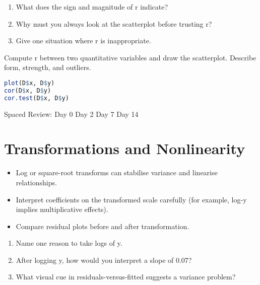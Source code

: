 \documentclass[11pt,a4paper]{article}
\def\textbf#1{#1}%
\newcommand{\reviewticks}{
  \vspace{0.4em}
  \noindent\scriptsize\textbf{Spaced Review:}
  \fbox{\phantom{D0}} Day 0\quad
  \fbox{\phantom{D2}} Day 2\quad
  \fbox{\phantom{D7}} Day 7\quad
  \fbox{\phantom{D14}} Day 14
}
\begin{document}
\begin{recallbox}
\begin{enumerate}
  \item What does the sign and magnitude of r indicate?
  \item Why must you always look at the scatterplot before trusting r?
  \item Give one situation where r is inappropriate.
\end{enumerate}
\end{recallbox}

\begin{practicebox}
Compute r between two quantitative variables and draw the scatterplot. Describe form, strength, and outliers.
\end{practicebox}

\begin{rbox}
\begin{lstlisting}[language=R]
plot(D$x, D$y)
cor(D$x, D$y)
cor.test(D$x, D$y)
\end{lstlisting}
\end{rbox}

\reviewticks

\section{Transformations and Nonlinearity}

\begin{corebox}
\begin{itemize}
  \item Log or square-root transforms can stabilise variance and linearise relationships.
  \item Interpret coefficients on the transformed scale carefully (for example, log-y implies multiplicative effects).
  \item Compare residual plots before and after transformation.
\end{itemize}
\end{corebox}

\begin{recallbox}
\begin{enumerate}
  \item Name one reason to take logs of y.
  \item After logging y, how would you interpret a slope of 0.07?
  \item What visual cue in residuals-versus-fitted suggests a variance problem?
\end{enumerate}
\end{recallbox}
\end{document}
